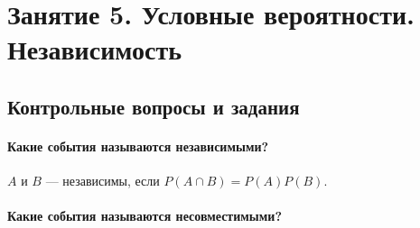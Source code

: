 \chapter*{Занятие 5. Условные вероятности. Независимость}

\section*{Контрольные вопросы и задания}

\subsubsection*{Какие события называются независимыми?}

$A$ и $B$ --- независимы, если $P \left( A \cap B \right) = P \left( A \right) P \left( B \right) $.

\subsubsection*{Какие события называются несовместимыми?}
